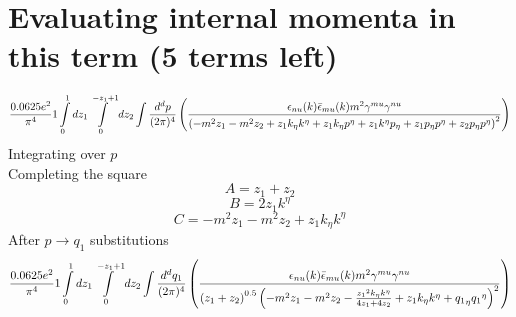 \section*{Evaluating internal momenta in this term (5 terms left)}
\begin{dmath}\frac{0.0625 e^{2}}{\pi^{4}}1\int\limits_{ 0 }^{ 1 } d{ z_{ 1 } }\int\limits_{ 0 }^{ - { z_{ 1 } } + 1 } d{ z_{ 2 } }\int\frac{d^d p }{ (2\pi)^4 }\left(\frac{\epsilon_{ \\nu }({ k }) \bar{\epsilon}_{ \\mu }({ k }) m^{2} { \gamma^{ \\mu } } { \gamma^{ \\nu } }}{\left(- m^{2} { z_{ 1 } } - m^{2} { z_{ 2 } } + { z_{ 1 } } { { k }_{ \eta } } { { k }^{ \eta } } + { z_{ 1 } } { { k }_{ \eta } } { { p }^{ \eta } } + { z_{ 1 } } { { k }^{ \eta } } { { p }_{ \eta } } + { z_{ 1 } } { { p }_{ \eta } } { { p }^{ \eta } } + { z_{ 2 } } { { p }_{ \eta } } { { p }^{ \eta } }\right)^{2}}\right)\end{dmath}
Integrating over $p$\\
Completing the square\
\begin{dmath}A = { z_{ 1 } } + { z_{ 2 } }\end{dmath}
\begin{dmath}B = 2 { z_{ 1 } } { { k }^{ \eta } }\end{dmath}
\begin{dmath}C = - m^{2} { z_{ 1 } } - m^{2} { z_{ 2 } } + { z_{ 1 } } { { k }_{ \eta } } { { k }^{ \eta } }\end{dmath}
After $p \to q_1$ substitutions
\begin{dmath}\frac{0.0625 e^{2}}{\pi^{4}}1\int\limits_{ 0 }^{ 1 } d{ z_{ 1 } }\int\limits_{ 0 }^{ - { z_{ 1 } } + 1 } d{ z_{ 2 } }\int\frac{d^d q_1 }{ (2\pi)^4 }\left(\frac{\epsilon_{ \\nu }({ k }) \bar{\epsilon}_{ \\mu }({ k }) m^{2} { \gamma^{ \\mu } } { \gamma^{ \\nu } }}{\left({ z_{ 1 } } + { z_{ 2 } }\right)^{0.5} \left(- m^{2} { z_{ 1 } } - m^{2} { z_{ 2 } } - \frac{{ z_{ 1 } }^{2} { { k }_{ \eta } } { { k }^{ \eta } }}{4 { z_{ 1 } } + 4 { z_{ 2 } }} + { z_{ 1 } } { { k }_{ \eta } } { { k }^{ \eta } } + { { q_1 }_{ \eta } } { { q_1 }^{ \eta } }\right)^{2}}\right)\end{dmath}
